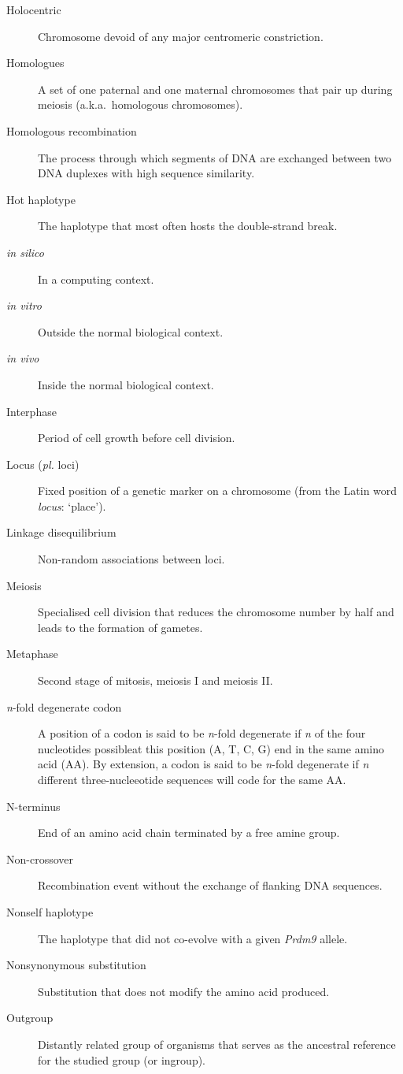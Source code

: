 \begin{alwayssingle}
\begin{description}
		\item[Holocentric] Chromosome devoid of any major centromeric constriction. 
		\item[Homologues] A set of one paternal and one maternal chromosomes that pair up during meiosis (a.k.a.\ homologous chromosomes).
		\item[Homologous recombination] The process through which segments of DNA are exchanged between two DNA duplexes with high sequence similarity.
		\item[Hot haplotype] The haplotype that most often hosts the double-strand break.
		\item[\textit{in silico}] In a computing context.
		\item[\textit{in vitro}] Outside the normal biological context.
		\item[\textit{in vivo}] Inside the normal biological context.
		\item[Interphase] Period of cell growth before cell division.
		\item[Locus (\textit{pl.} loci)] Fixed position of a genetic marker on a chromosome (from the Latin word \textit{locus}: ‘place’).
		\item[Linkage disequilibrium] Non-random associations between loci.
		\item[Meiosis] Specialised cell division that reduces the chromosome number by half and leads to the formation of gametes.
		\item[Metaphase] Second stage of mitosis, meiosis I and meiosis II\@.
		\item[\textit{n}-fold degenerate codon] A position of a codon is said to be \textit{n}-fold degenerate if \textit{n} of the four nucleotides possibleat this position (A, T, C, G) end in the same amino acid (AA). By extension, a codon is said to be \textit{n}-fold degenerate if \textit{n} different three-nucleeotide sequences will code for the same AA\@.
		\item[N-terminus] End of an amino acid chain terminated by a free amine group.
		\item[Non-crossover] Recombination event without the exchange of flanking DNA sequences.
		\item[Nonself haplotype] The haplotype that did not co-evolve with a given \textit{Prdm9} allele.
		\item[Nonsynonymous substitution] Substitution that does not modify the amino acid produced.
		\item[Outgroup] Distantly related group of organisms that serves as the ancestral reference for the studied group (or ingroup).

\end{description}
\end{alwayssingle}
